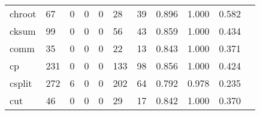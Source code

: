 \begin{longtable}{lp{1.2cm}p{1.2cm}p{1.2cm}p{1.2cm}p{1.2cm}p{1.2cm}p{1.2cm}p{1.2cm}p{1.2cm}p{1.2cm}}
chroot    &                                    67 &                                                  0 &                                                  0 &                                                  0 &                                                 28 &                                                 39 &                                              0.896 &                                              1.000 &                                              0.582 \\
cksum     &                                    99 &                                                  0 &                                                  0 &                                                  0 &                                                 56 &                                                 43 &                                              0.859 &                                              1.000 &                                              0.434 \\
comm      &                                    35 &                                                  0 &                                                  0 &                                                  0 &                                                 22 &                                                 13 &                                              0.843 &                                              1.000 &                                              0.371 \\
cp        &                                   231 &                                                  0 &                                                  0 &                                                  0 &                                                133 &                                                 98 &                                              0.856 &                                              1.000 &                                              0.424 \\
csplit    &                                   272 &                                                  6 &                                                  0 &                                                  0 &                                                202 &                                                 64 &                                              0.792 &                                              0.978 &                                              0.235 \\
cut       &                                    46 &                                                  0 &                                                  0 &                                                  0 &                                                 29 &                                                 17 &                                              0.842 &                                              1.000 &                                              0.370 \\

\end{longtable}
